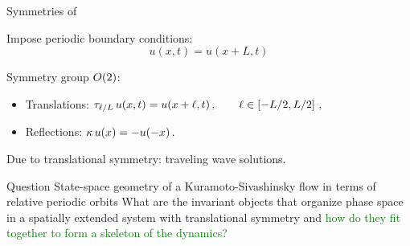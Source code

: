 \documentclass{beamer}
\begin{document}
\begin{frame}{Symmetries of \KSe}

Impose periodic boundary conditions:
\[
 u(x,t) = u(x+L,t)
\]

Symmetry group $O(2)$:
\begin{itemize}
 \item Translations: $\tau_{\ell/L}\, u(x,t) = u(x+\ell,t)\,,\qquad \ell\in\left[-L/2,L/2\right]\,,$
 \item Reflections:  $\kappa \, u(x) = -u(-x)\,.$
\end{itemize}

Due to translational symmetry: traveling wave solutions.

\begin{block}{Question} State-space geometry of a Kuramoto-Sivashinsky flow in terms of relative periodic orbits
What are the invariant objects that organize phase space in a spatially extended system 
with translational symmetry and \textcolor{green}{how do they fit together to form a
skeleton of the dynamics?}
\end{block}


\end{frame}



\end{document}
